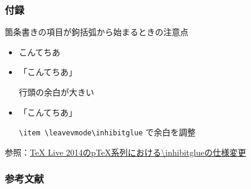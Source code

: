 \documentclass[
    12pt,
    unicode]{beamer}
\renewcommand\appendixname{付録}
\begin{document}
\begin{frame}
    \footnotesize
    \frametitle{\appendixname}
    箇条書きの項目が鉤括弧から始まるときの注意点
    \begin{itemize}
        \item こんてちあ
        \item 「こんてちあ」

            行頭の余白が大きい
        \item \leavevmode\inhibitglue 「こんてちあ」

            \texttt{\textbackslash item \textbackslash leavevmode\textbackslash inhibitglue} で余白を調整
    \end{itemize}

    \bigskip

    参照：\href{http://doratex.hatenablog.jp/entry/20140714/1405302796}{TeX Live 2014のpTeX系列における\textbackslash inhibitglueの仕様変更}
\end{frame}


\begin{frame}
    \frametitle{参考文献}
    \footnotesize
    
    
\end{frame}
\end{document}
